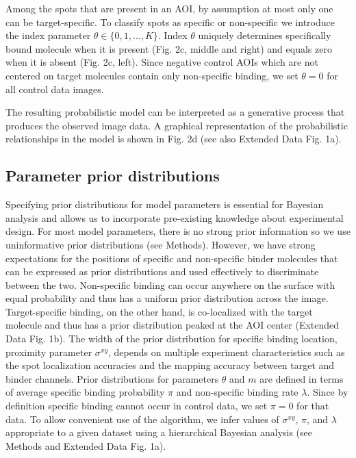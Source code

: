 Among the spots that are present in an AOI, by assumption at most only one can be target-specific. To classify spots as specific or non-specific we introduce the index parameter $\theta \in \{0,1,\dots,K\}$. Index $\theta$ uniquely determines specifically bound molecule when it is present (Fig. 2c, middle and right) and equals zero when it is absent (Fig. 2c, left). Since negative control AOIs which are not centered on target molecules contain only non-specific binding, we set $\theta = 0$ for all control data images. 

The resulting probabilistic model can be interpreted as a generative process that produces the observed image data. A graphical representation of the probabilistic relationships in the model is shown in Fig. 2d (see also Extended Data Fig. 1a).

\subsection*{Parameter prior distributions}

Specifying prior distributions for model parameters is essential for Bayesian analysis and allows us to incorporate pre-existing knowledge about experimental design. For most model parameters, there is no strong prior information so we use uninformative prior distributions (see Methods). However, we have strong expectations for the positions of specific and non-specific binder molecules that can be expressed as prior distributions and used effectively to discriminate between the two. Non-specific binding can occur anywhere on the surface with equal probability and thus has a uniform prior distribution across the image. Target-specific binding, on the other hand, is co-localized with the target molecule and thus has a prior distribution peaked at the AOI center (Extended Data Fig. 1b). The width of the prior distribution for specific binding location, proximity parameter $\sigma^{xy}$, depends on multiple experiment characteristics such as the spot localization accuracies and the mapping accuracy between target and binder channels. Prior distributions for parameters $\theta$ and $m$ are defined in terms of average specific binding probability $\pi$ and non-specific binding rate $\lambda$. Since by definition specific binding cannot occur in control data, we set $\pi = 0$ for that data. To allow convenient use of the algorithm, we infer values of $\sigma^{xy}$, $\pi$, and $\lambda$ appropriate to a given dataset using a hierarchical Bayesian analysis (see Methods and Extended Data Fig. 1a). 

